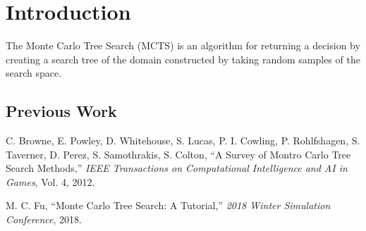 \section{Introduction}

The Monte Carlo Tree Search (MCTS) is an algorithm for returning a decision by creating a search tree of the domain constructed by taking random samples of the search space.  

\subsection{Previous Work}


\begin{thebibliography}{9}

C. Browne, E. Powley, D. Whitehouse, S. Lucas, P. I. Cowling, P. Rohlfshagen, S. Taverner, D. Perez, S. Samothrakis, S. Colton,  
``A Survey of Montro Carlo Tree Search Methods,'' 
{\em IEEE Transactions on Computational Intelligence and AI in Games}, Vol. 4, 2012.



M. C. Fu,
``Monte Carlo Tree Search: A Tutorial,'' 
{\em 2018 Winter Simulation Conference}, 2018.

\end{thebibliography}


